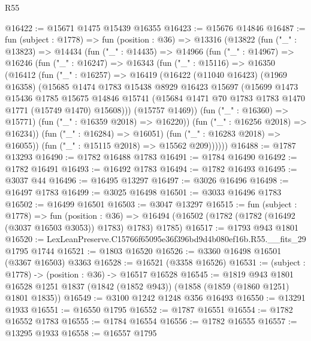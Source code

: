 \begin{lexlean}{R55}
\begin{coremodule}
@16422 := @15671 @1475 @15439 @16355
@16423 := @15676 @14846
@16487 := fun (subject : @1778) =>
  fun (position : @36) =>
  @13316
    (@13822
      (fun ("_" : @13823) =>
      @14434
        (fun ("_" : @14435) =>
        @14966
          (fun ("_" : @14967) =>
          @16246
            (fun ("_" : @16247) =>
            @16343
              (fun ("_" : @15116) =>
              @16350
                (@16412
                  (fun ("_" : @16257) =>
                  @16419
                    (@16422
                      (@11040 @16423)
                      (@1969 @16358)
                      (@15685
                        @1474
                        @1783
                        @15438
                        @8929
                        @16423
                        @15697
                        (@15699
                          @1473
                          @15436
                          @1785
                          @15675
                          @14846
                          @15741
                          (@15684 @1471 @70 @1783 @1783 @1470 @1771 (@15749 @1470) @15608)))
                      (@15757 @1469))
                    (fun ("_" : @16360) => @15771)
                    (fun ("_" : @16359 @2018) => @16220))
                  (fun ("_" : @16256 @2018) => @16234))
                (fun ("_" : @16284) => @16051)
                (fun ("_" : @16283 @2018) => @16055))
              (fun ("_" : @15115 @2018) => @15562 @209))))))
@16488 := @1787 @13293
@16490 := @1782 @16488 @1783
@16491 := @1784 @16490
@16492 := @1782 @16491
@16493 := @16492 @1783
@16494 := @1782 @16493
@16495 := @3037 @44
@16496 := @16495 @13297
@16497 := @3026 @16496
@16498 := @16497 @1783
@16499 := @3025 @16498
@16501 := @3033 @16496 @1783
@16502 := @16499 @16501
@16503 := @3047 @13297
@16515 := fun (subject : @1778) =>
  fun (position : @36) =>
  @16494 (@16502 (@1782 (@1782 (@16492 (@3037 @16503 @3053)) @1783) @1783) @1785)
@16517 := @1793 @943 @1801
@16520 := LexLeanPreserve.C15766f65095e36f396bd9d4b080ef16b.R55.__fits_29 @1795 @1744
@16521 := @1803 @16520
@16526 := @3360 @16498 @16501 (@3367 @16503) @3363
@16528 := @16521 (@3358 @16526)
@16531 := (subject : @1778) -> (position : @36) -> @16517 @16528
@16545 := @1819
    @943
    @1801
    @16528
    @1251
    @1837
    (@1842 (@1852 @943))
    (@1858 (@1859 (@1860 @1251) @1801 @1835))
@16549 := @3100 @1242 @1248 @356 @16493
@16550 := @13291 @1933
@16551 := @16550 @1795
@16552 := @1787 @16551
@16554 := @1782 @16552 @1783
@16555 := @1784 @16554
@16556 := @1782 @16555
@16557 := @13295 @1933
@16558 := @16557 @1795

\end{coremodule}
\end{lexlean}
